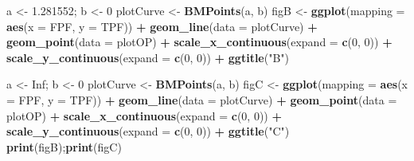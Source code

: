 \documentclass[]{book}
\newenvironment{Shaded}{\begin{snugshade}}{\end{snugshade}}
\newcommand{\DataTypeTok}[1]{\textcolor[rgb]{0.13,0.29,0.53}{#1}}
\newcommand{\DecValTok}[1]{\textcolor[rgb]{0.00,0.00,0.81}{#1}}
\newcommand{\FloatTok}[1]{\textcolor[rgb]{0.00,0.00,0.81}{#1}}
\newcommand{\KeywordTok}[1]{\textcolor[rgb]{0.13,0.29,0.53}{\textbf{#1}}}
\newcommand{\NormalTok}[1]{#1}
\newcommand{\OperatorTok}[1]{\textcolor[rgb]{0.81,0.36,0.00}{\textbf{#1}}}
\newcommand{\OtherTok}[1]{\textcolor[rgb]{0.56,0.35,0.01}{#1}}
\newcommand{\StringTok}[1]{\textcolor[rgb]{0.31,0.60,0.02}{#1}}
\begin{document}
\begin{Shaded}
\begin{Highlighting}[]
\NormalTok{a <-}\StringTok{ }\FloatTok{1.281552}\NormalTok{; b <-}\StringTok{ }\DecValTok{0}
\NormalTok{plotCurve <-}\StringTok{ }\KeywordTok{BMPoints}\NormalTok{(a, b)}
\NormalTok{figB <-}\StringTok{ }\KeywordTok{ggplot}\NormalTok{(}\DataTypeTok{mapping =} \KeywordTok{aes}\NormalTok{(}\DataTypeTok{x =}\NormalTok{ FPF, }\DataTypeTok{y =}\NormalTok{ TPF)) }\OperatorTok{+}\StringTok{ }
\StringTok{  }\KeywordTok{geom_line}\NormalTok{(}\DataTypeTok{data =}\NormalTok{ plotCurve) }\OperatorTok{+}\StringTok{ }
\StringTok{  }\KeywordTok{geom_point}\NormalTok{(}\DataTypeTok{data =}\NormalTok{ plotOP)  }\OperatorTok{+}\StringTok{ }
\StringTok{  }\KeywordTok{scale_x_continuous}\NormalTok{(}\DataTypeTok{expand =} \KeywordTok{c}\NormalTok{(}\DecValTok{0}\NormalTok{, }\DecValTok{0}\NormalTok{)) }\OperatorTok{+}\StringTok{ }
\StringTok{  }\KeywordTok{scale_y_continuous}\NormalTok{(}\DataTypeTok{expand =} \KeywordTok{c}\NormalTok{(}\DecValTok{0}\NormalTok{, }\DecValTok{0}\NormalTok{)) }\OperatorTok{+}
\StringTok{  }\KeywordTok{ggtitle}\NormalTok{(}\StringTok{"B"}\NormalTok{)}

\NormalTok{a <-}\StringTok{ }\OtherTok{Inf}\NormalTok{; b <-}\StringTok{ }\DecValTok{0}
\NormalTok{plotCurve <-}\StringTok{ }\KeywordTok{BMPoints}\NormalTok{(a, b)}
\NormalTok{figC <-}\StringTok{ }\KeywordTok{ggplot}\NormalTok{(}\DataTypeTok{mapping =} \KeywordTok{aes}\NormalTok{(}\DataTypeTok{x =}\NormalTok{ FPF, }\DataTypeTok{y =}\NormalTok{ TPF)) }\OperatorTok{+}\StringTok{ }
\StringTok{  }\KeywordTok{geom_line}\NormalTok{(}\DataTypeTok{data =}\NormalTok{ plotCurve) }\OperatorTok{+}\StringTok{ }
\StringTok{  }\KeywordTok{geom_point}\NormalTok{(}\DataTypeTok{data =}\NormalTok{ plotOP)  }\OperatorTok{+}\StringTok{ }
\StringTok{  }\KeywordTok{scale_x_continuous}\NormalTok{(}\DataTypeTok{expand =} \KeywordTok{c}\NormalTok{(}\DecValTok{0}\NormalTok{, }\DecValTok{0}\NormalTok{)) }\OperatorTok{+}\StringTok{ }
\StringTok{  }\KeywordTok{scale_y_continuous}\NormalTok{(}\DataTypeTok{expand =} \KeywordTok{c}\NormalTok{(}\DecValTok{0}\NormalTok{, }\DecValTok{0}\NormalTok{)) }\OperatorTok{+}
\StringTok{  }\KeywordTok{ggtitle}\NormalTok{(}\StringTok{"C"}\NormalTok{)}
\KeywordTok{print}\NormalTok{(figB);}\KeywordTok{print}\NormalTok{(figC)}
\end{Highlighting}
\end{Shaded}
\end{document}
